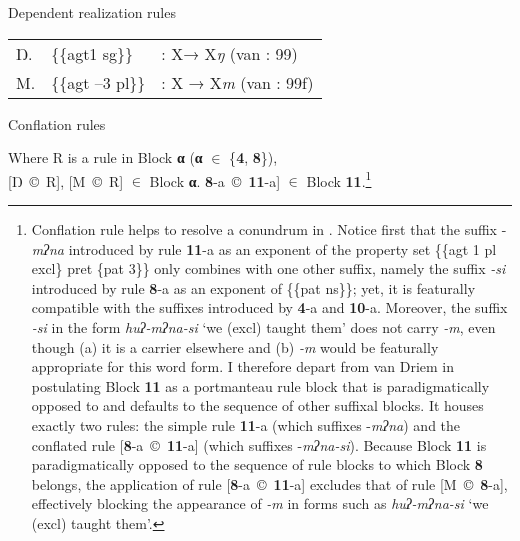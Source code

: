 \documentclass[output=paper,
modfonts
]{LSP/langsci}
\begin{document}
\ea Dependent realization rules %
    \label{ex:stump:5}
    
	\begin{tabular}{lll}
	 Ŋ. & \{\{agt\textsc{1} sg\}\}  & : X→ X\textit{ŋ}  (van \citealt{Driem1987}: 99)\\
	M. &  \{\{agt –3 pl\}\} &  : X → X\textit{m} (van \citealt{Driem1987}: 99f)
	\end{tabular}
\z
      
\ea Conflation rules %
    \label{ex:stump:6}
    \begin{xlist}
    \ex Where R is a rule in Block \textbf{α} (\textbf{α} ${\in}$ \{\textbf{4}, \textbf{8}\}), \\
    		{}[Ŋ~©~R],  [M~©~R]  ${\in}$ Block \textbf{α}.
     \ex  {[}\textbf{8}\nobreakdash-a~©~\textbf{11}\nobreakdash-a] ${\in}$ Block \textbf{11}.\footnote{Conflation rule  helps to resolve a conundrum in .  Notice first that the suffix -\textit{mʔna} introduced by rule \textbf{11}{}-a as an exponent of the property set \{\{agt 1 pl excl\} pret \{pat 3\}\} only combines with one other suffix, namely the suffix \textit{{}-si}  introduced by rule \textbf{8}{}-a as an exponent of \{\{pat\textsc{} ns\}\}; yet, it is featurally compatible with the suffixes introduced by \textbf{4}{}-a and \textbf{10}{}-a.  Moreover, the suffix \textit{{}-si} in the form \textit{huʔ\nobreakdash-mʔna\nobreakdash-si} ‘we (excl) taught them’ does not carry \textit{{}-m}, even though (a) it is a carrier elsewhere and (b) \textit{{}-m} would be featurally appropriate for this word form.  I therefore depart from van Driem in postulating Block \textbf{11} as a portmanteau rule block \citep[141]{Stump2001} that is paradigmatically opposed to and defaults to the sequence of other suffixal blocks.  It houses exactly two rules:  the simple rule \textbf{11}{}-a (which suffixes \nobreakdash-\textit{mʔna}) and the conflated rule [\textbf{8}\nobreakdash-a~©~\textbf{11}\nobreakdash-a] (which suffixes -\textit{mʔna-si}).  Because Block \textbf{11} is paradigmatically opposed to the sequence of rule blocks to which Block \textbf{8} belongs, the application of rule [\textbf{8}\nobreakdash-a~©~\textbf{11}\nobreakdash-a] excludes that of rule [M~©~\textbf{8}\nobreakdash-a], effectively blocking the appearance of \textit{{}-m} in forms such as \textit{huʔ\nobreakdash-mʔna\nobreakdash-si} ‘we (excl) taught them’.}
     \end{xlist}
\z
\end{document}
